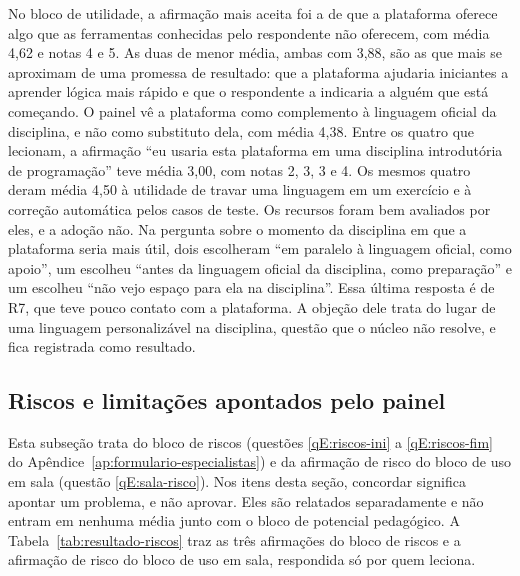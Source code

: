 No bloco de utilidade, a afirmação mais aceita foi a de que a plataforma oferece algo que as ferramentas conhecidas pelo respondente não oferecem, com média 4,62 e notas 4 e 5. As duas de menor média, ambas com 3,88, são as que mais se aproximam de uma promessa de resultado: que a plataforma ajudaria iniciantes a aprender lógica mais rápido e que o respondente a indicaria a alguém que está começando. O painel vê a plataforma como complemento à linguagem oficial da disciplina, e não como substituto dela, com média 4,38. Entre os quatro que lecionam, a afirmação ``eu usaria esta plataforma em uma disciplina introdutória de programação'' teve média 3,00, com notas 2, 3, 3 e 4. Os mesmos quatro deram média 4,50 à utilidade de travar uma linguagem em um exercício e à correção automática pelos casos de teste. Os recursos foram bem avaliados por eles, e a adoção não. Na pergunta sobre o momento da disciplina em que a plataforma seria mais útil, dois escolheram ``em paralelo à linguagem oficial, como apoio'', um escolheu ``antes da linguagem oficial da disciplina, como preparação'' e um escolheu ``não vejo espaço para ela na disciplina''. Essa última resposta é de R7, que teve pouco contato com a plataforma. A objeção dele trata do lugar de uma linguagem personalizável na disciplina, questão que o núcleo não resolve, e fica registrada como resultado.

\subsection{Riscos e limitações apontados pelo painel}
\label{sec:resultado-riscos}

Esta subseção trata do bloco de riscos (questões \ref{qE:riscos-ini} a \ref{qE:riscos-fim} do Apêndice~\ref{ap:formulario-especialistas}) e da afirmação de risco do bloco de uso em sala (questão \ref{qE:sala-risco}). Nos itens desta seção, concordar significa apontar um problema, e não aprovar. Eles são relatados separadamente e não entram em nenhuma média junto com o bloco de potencial pedagógico. A Tabela~\ref{tab:resultado-riscos} traz as três afirmações do bloco de riscos e a afirmação de risco do bloco de uso em sala, respondida só por quem leciona.

